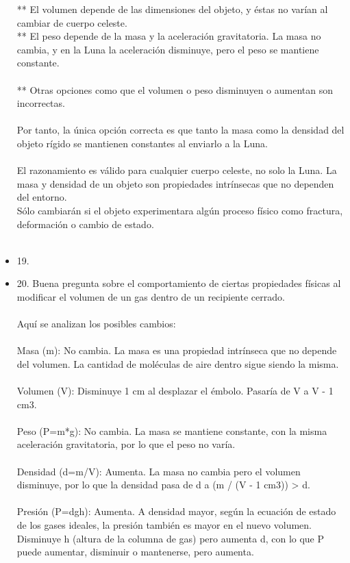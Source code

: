 \documentclass{article}
\begin{document}
\begin{itemize}
** El volumen depende de las dimensiones del objeto, y éstas no varían al cambiar de cuerpo celeste.\\
** El peso depende de la masa y la aceleración gravitatoria. La masa no cambia, y en la Luna la aceleración disminuye, pero el peso se mantiene constante.\\
\\
** Otras opciones como que el volumen o peso disminuyen o aumentan son incorrectas.\\
\\
Por tanto, la única opción correcta es que tanto la masa como la densidad del objeto rígido se mantienen constantes al enviarlo a la Luna.\\
\\
El razonamiento es válido para cualquier cuerpo celeste, no solo la Luna. La masa y densidad de un objeto son propiedades intrínsecas que no dependen del entorno.\\
Sólo cambiarán si el objeto experimentara algún proceso físico como fractura, deformación o cambio de estado.\\
\\
\item{19.}
\item{20.}
Buena pregunta sobre el comportamiento de ciertas propiedades físicas al modificar el volumen de un gas dentro de un recipiente cerrado.\\
\\
Aquí se analizan los posibles cambios:\\
\\
Masa (m): No cambia. La masa es una propiedad intrínseca que no depende del volumen. La cantidad de moléculas de aire dentro sigue siendo la misma.\\
\\
Volumen (V): Disminuye 1 cm al desplazar el émbolo. Pasaría de V a V - 1 cm3.\\
\\
Peso (P=m*g): No cambia. La masa se mantiene constante, con la misma aceleración gravitatoria, por lo que el peso no varía.\\
\\
Densidad (d=m/V): Aumenta. La masa no cambia pero el volumen disminuye, por lo que la densidad pasa de d a (m / (V - 1 cm3)) > d.\\
\\
Presión (P=dgh): Aumenta. A densidad mayor, según la ecuación de estado de los gases ideales, la presión también es mayor en el nuevo volumen. Disminuye h (altura de la columna de gas) pero aumenta d, con lo que P puede aumentar, disminuir o mantenerse, pero aumenta.\\

\end{itemize}
\end{document}
